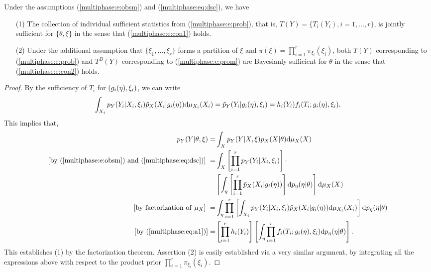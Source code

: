 \begin{theorem}
\label{multiphase:thm:dsc}
Under the assumptions (\ref{multiphase:e:obsm}) and (\ref{multiphase:eq:dsc}), we have 
\begin{itemize}
\item[(1)] The collection of individual sufficient statistics from (\ref{multiphase:e:prob}), that is, $T(Y)=\{T_i(Y_i), i=1,\ldots, r\}$,  is  jointly sufficient for $\{\theta,\xi\}$ in the sense  that  (\ref{multiphase:e:con1}) holds.
\item[(2)] Under the additional assumption that $\{\xi_1,\ldots, \xi_r\}$ forms a partition of $\xi$ and $\pi(\xi)=\prod_{i=1}^r \pi_{\xi_i}(\xi_i)$, both $T(Y)$ corresponding to (\ref{multiphase:e:prob}) and $T^B(Y)$ corresponding to  (\ref{multiphase:e:prom}) are Bayesianly sufficient  for $\theta$  in the sense that (\ref{multiphase:e:con2}) holds. 
\end{itemize}
\end{theorem}
%       
\begin{proof}
 By the sufficiency of $T_i$ for $(g_i(\eta), \xi_i)$, we can write
\begin{equation}\label{multiphase:eq:a1}
  \int_{X_i} \pobs(Y_i | X_i, \obsparam_i) \pwork(X_i | g_i(\workparam)) \dd\mu_{X_i}(X_i) = \pywork (Y_i | g_i(\workparam), \obsparam_i) =h_i(Y_i) f_i(T_i ; g_i(\workparam), \obsparam_i).
\end{equation}
This implies that, 
\begin{align*}
\pobs(Y | \param, \obsparam) =&  \int_{X} \pobs(Y | X, \obsparam) \psci(X | \param)\dd \mu_X(X) \\
[{\rm by}\ (\ref{multiphase:e:obsm}) \ {\rm and}\ (\ref{multiphase:eq:dsc})]\ =& \int_{X} \left[ \prod_{i=1}^{r} \pobs(Y_i | X_i, \obsparam_i) \right] \cdot \\
& \left[ \int_{\eta} \left[ \prod_{i=1}^{r} \pwork(X_i | g_i(\workparam)) \right]\dd p_\workparam(\workparam | \param) \right]\dd \mu_X(X) \\
[{\rm by\ factorization\ of} \ \mu_X]\ =& \int_{\eta} \prod_{i=1}^{r} \left[ \int_{X_i} \pobs(Y_i | X_i, \obsparam_i) \pwork(X_i | g_i(\workparam))\dd \mu_{X_i}(X_i) \right]\dd p_\workparam(\workparam | \param)  \\ 
[{\rm by}\ (\ref{multiphase:eq:a1})] =& \left[ \prod_{i=1}^{r} h_i(Y_i) \right] \left[ \int_{\eta} \prod_{i=1}^{r} f_i(T_i;g_i(\workparam), \obsparam_i)\dd p_\workparam(\workparam | \param)\right] .
\end{align*}
This establishes (1) by the factorization theorem. 
Assertion (2) is easily established via a very similar argument, by integrating all the expressions above with respect to the product prior $\prod_{i=1}^r \pi_{\xi_i}(\xi_i)$.
\end{proof}

